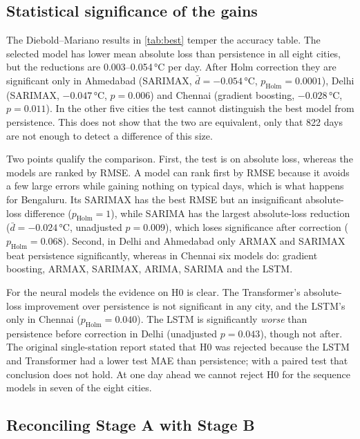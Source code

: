 \documentclass[11pt,a4paper]{article}
\newcommand{\degC}{\,\si{\degreeCelsius}}
\begin{document}
\subsection{Statistical significance of the gains}
\label{sec:dm}

The Diebold--Mariano results in \cref{tab:best} temper the accuracy table. The selected model has lower mean absolute loss than persistence in all eight cities, but the reductions are 0.003--0.054\degC{} per day. After Holm correction they are significant only in Ahmedabad (SARIMAX, $\bar d = -0.054$\degC, $p_{\text{Holm}} = 0.0001$), Delhi (SARIMAX, $-0.047$\degC, $p = 0.006$) and Chennai (gradient boosting, $-0.028$\degC, $p = 0.011$). In the other five cities the test cannot distinguish the best model from persistence. This does not show that the two are equivalent, only that 822 days are not enough to detect a difference of this size.

Two points qualify the comparison. First, the test is on absolute loss, whereas the models are ranked by RMSE. A model can rank first by RMSE because it avoids a few large errors while gaining nothing on typical days, which is what happens for Bengaluru. Its SARIMAX has the best RMSE but an insignificant absolute-loss difference ($p_{\text{Holm}} = 1$), while SARIMA has the largest absolute-loss reduction ($\bar d = -0.024$\degC, unadjusted $p = 0.009$), which loses significance after correction ($p_{\text{Holm}} = 0.068$). Second, in Delhi and Ahmedabad only ARMAX and SARIMAX beat persistence significantly, whereas in Chennai six models do: gradient boosting, ARMAX, SARIMAX, ARIMA, SARIMA and the LSTM.

For the neural models the evidence on H0 is clear. The Transformer's absolute-loss improvement over persistence is not significant in any city, and the LSTM's only in Chennai ($p_{\text{Holm}} = 0.040$). The LSTM is significantly \emph{worse} than persistence before correction in Delhi (unadjusted $p = 0.043$), though not after. The original single-station report stated that H0 was rejected because the LSTM and Transformer had a lower test MAE than persistence; with a paired test that conclusion does not hold. At one day ahead we cannot reject H0 for the sequence models in seven of the eight cities.

\subsection{Reconciling Stage A with Stage B}
\label{sec:reconcile}
\end{document}
